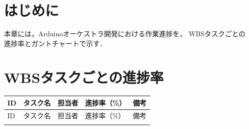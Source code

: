 
\section{はじめに}
本章には，Arduinoオーケストラ開発における作業進捗を，
WBSタスクごとの進捗率とガントチャートで示す．

\section{WBSタスクごとの進捗率}

\begingroup
\small
\begin{longtable}{p{0.9cm}p{7cm}p{2.5cm}p{2cm}p{2cm}}
\toprule
ID & タスク名 & 担当者 & 進捗率（\%） & 備考 \\
\midrule
\endfirsthead

\toprule
ID & タスク名 & 担当者 & 進捗率（\%） & 備考 \\
\midrule
\endhead

\bottomrule
\endfoot


\end{longtable}
